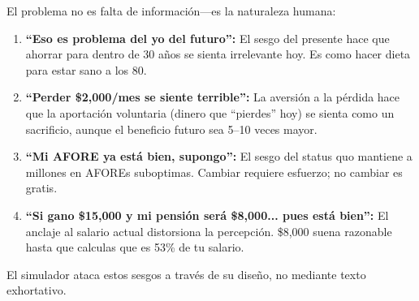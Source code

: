 \documentclass[11pt,a4paper]{report}
\begin{document}
\begin{tcolorbox}[colback=green!5!white, colframe=green!50!black, title=\textbf{Intuici\'on: Por Qu\'e la Gente No Ahorra para el Retiro}]
El problema no es falta de informaci\'on---es la naturaleza humana:

\begin{enumerate}
  \item \textbf{``Eso es problema del yo del futuro'':} El sesgo del presente hace que ahorrar para dentro de 30 a\~nos se sienta irrelevante hoy. Es como hacer dieta para estar sano a los 80.

  \item \textbf{``Perder \$2,000/mes se siente terrible'':} La aversi\'on a la p\'erdida hace que la aportaci\'on voluntaria (dinero que ``pierdes'' hoy) se sienta como un sacrificio, aunque el beneficio futuro sea 5--10 veces mayor.

  \item \textbf{``Mi AFORE ya est\'a bien, supongo'':} El sesgo del status quo mantiene a millones en AFOREs suboptimas. Cambiar requiere esfuerzo; no cambiar es gratis.

  \item \textbf{``Si gano \$15,000 y mi pensi\'on ser\'a \$8,000... pues est\'a bien'':} El anclaje al salario actual distorsiona la percepci\'on. \$8,000 suena razonable hasta que calculas que es 53\% de tu salario.
\end{enumerate}

El simulador ataca estos sesgos a trav\'es de su dise\~no, no mediante texto exhortativo.
\end{tcolorbox}
\end{document}

